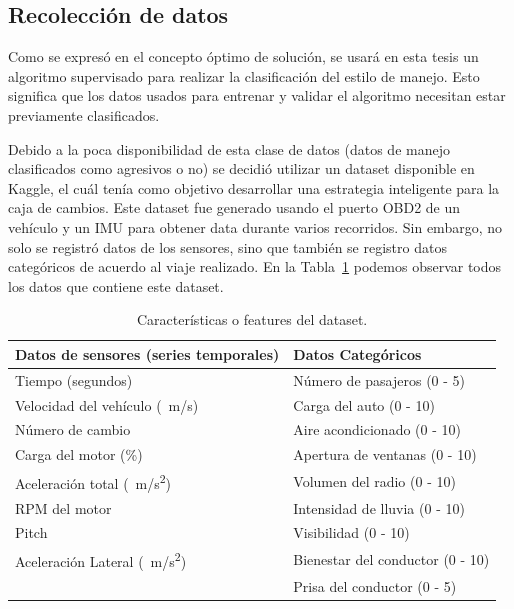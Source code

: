 \subsection{Recolección de datos}
Como se expresó en el concepto óptimo de solución, se usará en esta tesis un algoritmo supervisado para realizar la clasificación del estilo de manejo. Esto significa que los datos usados para entrenar y validar el algoritmo necesitan estar previamente clasificados.

Debido a la poca disponibilidad de esta clase de datos (datos de manejo clasificados como agresivos o no) se decidió utilizar un dataset disponible en Kaggle, el cuál tenía como objetivo desarrollar una estrategia inteligente para la caja de cambios. Este dataset fue generado usando el puerto OBD2 de un vehículo y un IMU para obtener data durante varios recorridos. Sin embargo, no solo se registró datos de los sensores, sino que también se registro datos categóricos de acuerdo al viaje realizado. En la Tabla~\ref{diag:Dataset} podemos observar todos los datos que contiene este dataset.

\bgroup
\def\arraystretch{1.5}%
\begin{table}[bth!]
\centering
\caption[Características o features del dataset]{Características o features del dataset.}
\begin{tabular}{@{}ll@{}}
\toprule
Datos de sensores (series temporales) & Datos Categóricos \\ \midrule
Tiempo (segundos) & Número de pasajeros (0 - 5) \\
Velocidad del vehículo (\SI{}{m/s}) & Carga del auto (0 - 10) \\
Número de cambio & Aire acondicionado (0 - 10) \\
Carga del motor (\%) & Apertura de ventanas (0 - 10) \\
Aceleración total (\SI{}{m/s^2}) & Volumen del radio (0 - 10) \\
RPM del motor & Intensidad de lluvia (0 - 10) \\
Pitch  & Visibilidad (0 - 10) \\
Aceleración Lateral (\SI{}{m/s^2}) & Bienestar del conductor (0 - 10) \\
 & Prisa del conductor (0 - 5) \\ \bottomrule
\end{tabular}
\label{diag:Dataset}
\end{table}
\egroup



